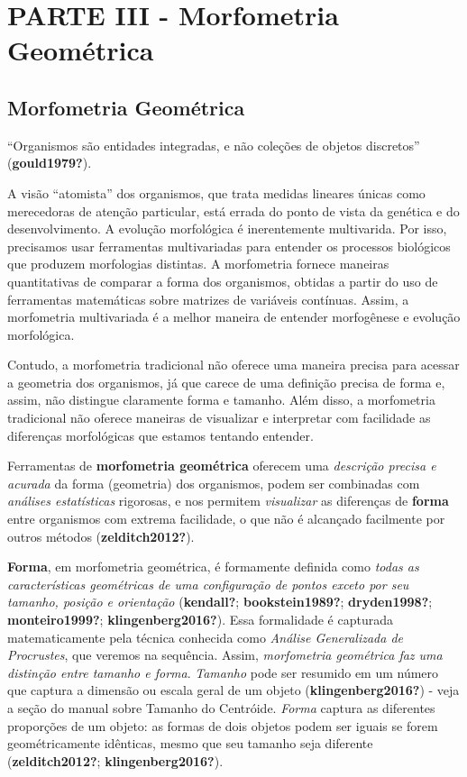 \documentclass[
]{book}
\begin{document}
\part{PARTE III - Morfometria Geométrica}\label{part-parte-iii---morfometria-geomuxe9trica}

\chapter{Morfometria Geométrica}\label{cap3}

``Organismos são entidades integradas, e não coleções de objetos discretos'' (\textbf{gould1979?}).

A visão ``atomista'' dos organismos, que trata medidas lineares únicas como merecedoras de atenção particular, está errada do ponto de vista da genética e do desenvolvimento. A evolução morfológica é inerentemente multivarida. Por isso, precisamos usar ferramentas multivariadas para entender os processos biológicos que produzem morfologias distintas. A morfometria fornece maneiras quantitativas de comparar a forma dos organismos, obtidas a partir do uso de ferramentas matemáticas sobre matrizes de variáveis contínuas. Assim, a morfometria multivariada é a melhor maneira de entender morfogênese e evolução morfológica.

Contudo, a morfometria tradicional não oferece uma maneira precisa para acessar a geometria dos organismos, já que carece de uma definição precisa de forma e, assim, não distingue claramente forma e tamanho. Além disso, a morfometria tradicional não oferece maneiras de visualizar e interpretar com facilidade as diferenças morfológicas que estamos tentando entender.

Ferramentas de \textbf{morfometria geométrica} oferecem uma \emph{descrição precisa e acurada} da forma (geometria) dos organismos, podem ser combinadas com \emph{análises estatísticas} rigorosas, e nos permitem \emph{visualizar} as diferenças de \textbf{forma} entre organismos com extrema facilidade, o que não é alcançado facilmente por outros métodos (\textbf{zelditch2012?}).

\textbf{Forma}, em morfometria geométrica, é formamente definida como \emph{todas as características geométricas de uma configuração de pontos exceto por seu tamanho, posição e orientação} (\textbf{kendall?}; \textbf{bookstein1989?}; \textbf{dryden1998?}; \textbf{monteiro1999?}; \textbf{klingenberg2016?}). Essa formalidade é capturada matematicamente pela técnica conhecida como \emph{Análise Generalizada de Procrustes}, que veremos na sequência. Assim, \emph{morfometria geométrica faz uma distinção entre tamanho e forma}. \emph{Tamanho} pode ser resumido em um número que captura a dimensão ou escala geral de um objeto (\textbf{klingenberg2016?}) - veja a seção do manual sobre Tamanho do Centróide. \emph{Forma} captura as diferentes proporções de um objeto: as formas de dois objetos podem ser iguais se forem geométricamente idênticas, mesmo que seu tamanho seja diferente (\textbf{zelditch2012?}; \textbf{klingenberg2016?}).
\end{document}
